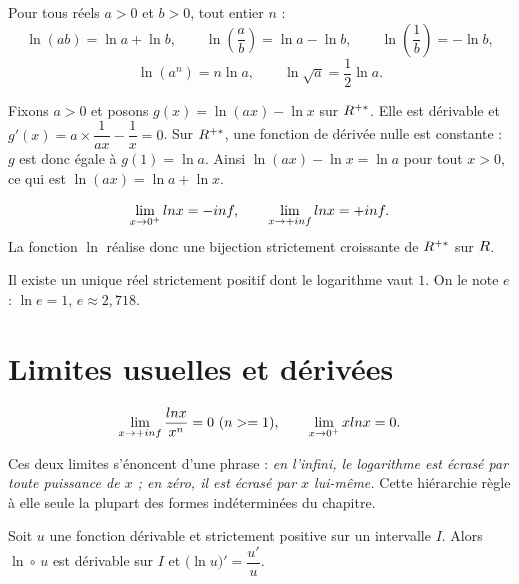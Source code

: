 \begin{theoreme}
Pour tous réels $a>0$ et $b>0$, tout entier $n$ :
\[
  \ln(ab) = \ln a + \ln b, \qquad
  \ln\!\left(\frac{a}{b}\right) = \ln a - \ln b, \qquad
  \ln\!\left(\frac{1}{b}\right) = -\ln b,
\]
\[
  \ln\left(a^{n}\right) = n\ln a, \qquad
  \ln\sqrt{a} = \frac{1}{2}\ln a .
\]
\end{theoreme}

\begin{demonstration}
Fixons $a>0$ et posons $g(x) = \ln(ax) - \ln x$ sur $R^{+*}$. Elle est
dérivable et
$g'(x) = a \times \dfrac{1}{ax} - \dfrac{1}{x} = 0$.
Sur $R^{+*}$, une fonction de dérivée nulle est constante : $g$ est donc égale
à $g(1) = \ln a$. Ainsi $\ln(ax) - \ln x = \ln a$ pour tout $x>0$, ce qui est
$\ln(ax) = \ln a + \ln x$.
\end{demonstration}

\begin{propriete}
\[
  \lim_{x \to 0^{+}} \ln x = -\infty, \qquad \limpinf \ln x = +\infty .
\]
La fonction $\ln$ réalise donc une bijection strictement croissante de $R^{+*}$
sur $R$.
\end{propriete}

\begin{definition}[le nombre $e$]
Il existe un unique réel strictement positif dont le logarithme vaut $1$. On
le note $e$ : $\ln e = 1$, $e \approx 2{,}718$.
\end{definition}

\section{Limites usuelles et dérivées}

\begin{theoreme}
\[
  \limpinf \frac{\ln x}{x^{n}} = 0 \ (n \geq 1), \qquad
  \lim_{x \to 0^{+}} x\ln x = 0 .
\]
\end{theoreme}

\begin{remarque}
Ces deux limites s'énoncent d'une phrase : \emph{en l'infini, le logarithme
est écrasé par toute puissance de $x$ ; en zéro, il est écrasé par $x$
lui-même.} Cette hiérarchie règle à elle seule la plupart des formes
indéterminées du chapitre.
\end{remarque}

\begin{theoreme}
Soit $u$ une fonction dérivable et strictement positive sur un intervalle $I$.
Alors $\ln \circ\, u$ est dérivable sur $I$ et
$\bigl(\ln u\bigr)' = \dfrac{u'}{u}$.
\end{theoreme}


